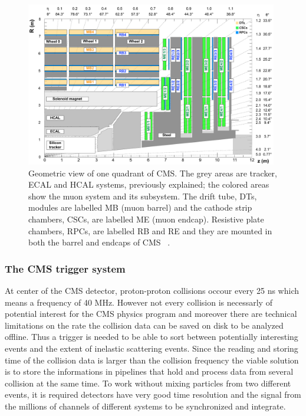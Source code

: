 \begin{figure}[h]
\centering
\includegraphics[width=0.98\textwidth]{Figures/c2/cms_quadrant_run_ii.pdf}
\caption{Geometric view of one quadrant of CMS. The grey areas are
  tracker, ECAL and HCAL systems, previously explained; the colored
  areas show the muon system and its subsystem. The drift tube, DTs,
  modules are labelled MB (muon barrel) and the cathode strip
  chambers, CSCs, are labelled ME (muon endcap). Resistive plate
  chambers, RPCs, are labelled RB and RE and they are mounted in both the barrel and endcaps of CMS
~\cite{muonsystemPU}. }
\label{fig:muonsystem}
\end{figure} 

\subsubsection{The CMS trigger system}\label{sec:triggersystem}

At center of the CMS detector, proton-proton collisions occour every
25 ns which means a frequency of 40 MHz. However not every collision is
necessarly of potential interest for the CMS physics program and
moreover there are technical limitations on the rate the collision data can be
saved on disk to be analyzed offline. Thus a trigger is needed to be
able to sort between potentially interesting events and the extent of
inelastic scattering events.
Since the reading and storing time of the collision data is larger
than the collision frequency the viable solution is
to store the informations in pipelines that hold and process data
from several collision at the same time.
To work without mixing particles from two different events, it is
required detectors have very good time
resolution and the signal from the millions of channels of different
systems to be synchronized and integrate.

